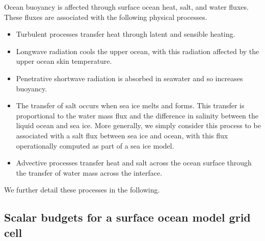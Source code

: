 Ocean buoyancy is affected through surface ocean heat, salt, and water
fluxes.  These fluxes are associated with the following physical
processes.
\begin{itemize}

\item Turbulent processes transfer heat through latent and sensible
  heating.

\item Longwave radiation cools the upper ocean, with this radiation
  affected by the upper ocean skin temperature.  

\item Penetrative shortwave radiation is absorbed in seawater and so
  increases buoyancy.

\item The transfer of salt occurs when sea ice melts and forms.  This
  transfer is proportional to the water mass flux and the difference
  in salinity between the liquid ocean and sea ice.  More generally,
  we simply consider this process to be associated with a salt flux
  between sea ice and ocean, with this flux operationally computed as
  part of a sea ice model.

\item Advective processes transfer heat and salt across the ocean
  surface through the transfer of water mass across the interface.

\end{itemize}
  We further detail these processes in the following. 


\subsection{Scalar budgets for a surface ocean model grid cell}

